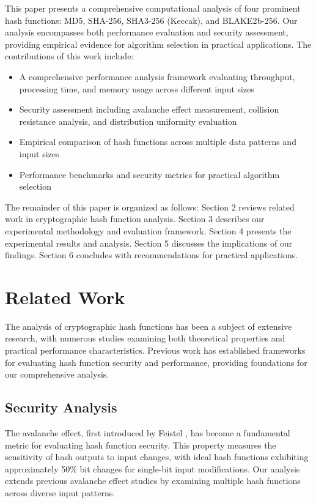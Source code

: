 \documentclass{article}
\begin{document}
This paper presents a comprehensive computational analysis of four prominent hash functions: MD5, SHA-256, SHA3-256 (Keccak), and BLAKE2b-256. Our analysis encompasses both performance evaluation and security assessment, providing empirical evidence for algorithm selection in practical applications. The contributions of this work include:

\begin{itemize}
\item A comprehensive performance analysis framework evaluating throughput, processing time, and memory usage across different input sizes
\item Security assessment including avalanche effect measurement, collision resistance analysis, and distribution uniformity evaluation
\item Empirical comparison of hash functions across multiple data patterns and input sizes
\item Performance benchmarks and security metrics for practical algorithm selection
\end{itemize}

The remainder of this paper is organized as follows: Section 2 reviews related work in cryptographic hash function analysis. Section 3 describes our experimental methodology and evaluation framework. Section 4 presents the experimental results and analysis. Section 5 discusses the implications of our findings. Section 6 concludes with recommendations for practical applications.

\section{Related Work}

The analysis of cryptographic hash functions has been a subject of extensive research, with numerous studies examining both theoretical properties and practical performance characteristics. Previous work has established frameworks for evaluating hash function security and performance, providing foundations for our comprehensive analysis.

\subsection{Security Analysis}

The avalanche effect, first introduced by Feistel \cite{feistel1973cryptographic}, has become a fundamental metric for evaluating hash function security. This property measures the sensitivity of hash outputs to input changes, with ideal hash functions exhibiting approximately 50\% bit changes for single-bit input modifications. Our analysis extends previous avalanche effect studies by examining multiple hash functions across diverse input patterns.
\end{document}
